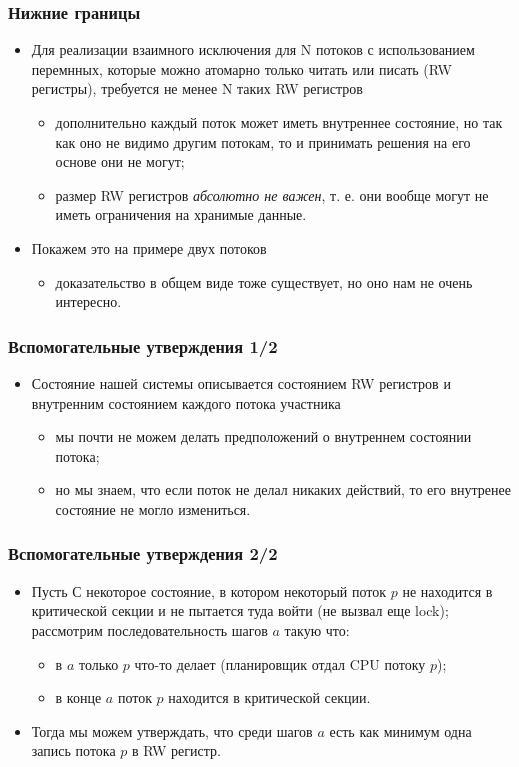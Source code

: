 \begin{frame}
\frametitle{Нижние границы}
\begin{itemize}
  \item Для реализации взаимного исключения для N потоков с использованием
  перемнных, которые можно атомарно только читать или писать (RW регистры),
  требуется не менее N таких RW регистров
  \begin{itemize}
    \item дополнительно каждый поток может иметь внутреннее состояние, но так
    как оно не видимо другим потокам, то и принимать решения на его основе они
    не могут;
    \item размер RW регистров \emph{абсолютно не важен}, т. е. они вообще могут
    не иметь ограничения на хранимые данные.
  \end{itemize}
  \item Покажем это на примере двух потоков
  \begin{itemize}
    \item доказательство в общем виде тоже существует, но оно нам не очень
    интересно.
  \end{itemize}
\end{itemize}
\end{frame}

\begin{frame}
\frametitle{Вспомогательные утверждения 1/2}
\begin{itemize}
  \item Состояние нашей системы описывается состоянием RW регистров и внутренним
  состоянием каждого потока участника
  \begin{itemize}
    \item мы почти не можем делать предположений о внутреннем состоянии потока;
    \item но мы знаем, что если поток не делал никаких действий, то его
    внутренее состояние не могло измениться.
  \end{itemize}
\end{itemize}
\end{frame}

\begin{frame}
\frametitle{Вспомогательные утверждения 2/2}
\begin{itemize}
  \item Пусть $С$ некоторое состояние, в котором некоторый поток $p$ не
  находится в критической секции и не пытается туда войти (не вызвал еще lock);
  рассмотрим последовательность шагов $a$ такую что:
  \begin{itemize}
    \item в $a$ только $p$ что-то делает (планировщик отдал CPU потоку $p$);
    \item в конце $a$ поток $p$ находится в критической секции.
  \end{itemize}
  \item Тогда мы можем утверждать, что среди шагов $a$ есть как минимум одна
  запись потока $p$ в RW регистр.
\end{itemize}
\end{frame}

